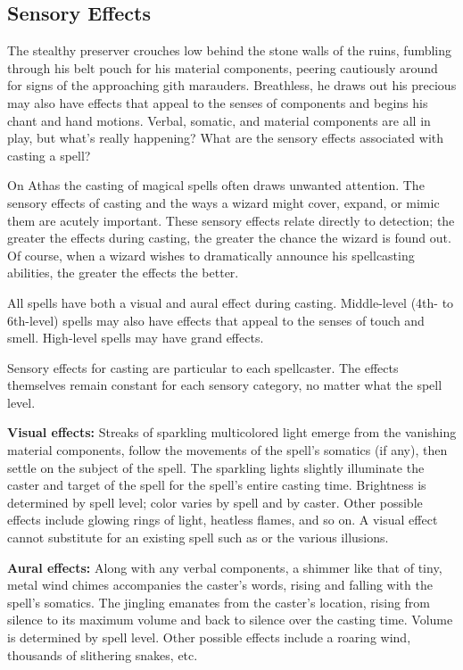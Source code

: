 \subsection{Sensory Effects}
The stealthy preserver crouches low behind the stone walls of the ruins, fumbling through his belt pouch for his material components, peering cautiously around for signs of the approaching gith marauders. Breathless, he draws out his precious may also have effects that appeal to the senses of components and begins his chant and hand motions. Verbal, somatic, and material components are all in play, but what's really happening? What are the sensory effects associated with casting a spell?

On Athas the casting of magical spells often draws unwanted attention. The sensory effects of casting and the ways a wizard might cover, expand, or mimic them are acutely important. These sensory effects relate directly to detection; the greater the effects during casting, the greater the chance the wizard is found out. Of course, when a wizard wishes to dramatically announce his spellcasting abilities, the greater the effects the better.

All spells have both a visual and aural effect during casting. Middle-level (4th- to 6th-level) spells may also have effects that appeal to the senses of touch and smell. High-level spells may have grand effects.

Sensory effects for casting are particular to each spellcaster. The effects themselves remain constant for each sensory category, no matter what the spell level.

\textbf{Visual effects:} Streaks of sparkling multicolored light emerge from the vanishing material components, follow the movements of the spell's somatics (if any), then settle on the subject of the spell. The sparkling lights slightly illuminate the caster and target of the spell for the spell's entire casting time. Brightness is determined by spell level; color varies by spell and by caster. Other possible effects include glowing rings of light, heatless flames, and so on. A visual effect cannot substitute for an existing spell such as  or the various illusions.

\textbf{Aural effects:} Along with any verbal components, a shimmer like that of tiny, metal wind chimes accompanies the caster's words, rising and falling with the spell's somatics. The jingling emanates from the caster's location, rising from silence to its maximum volume and back to silence over the casting time. Volume is determined by spell level. Other possible effects include a roaring wind, thousands of slithering snakes, etc.


